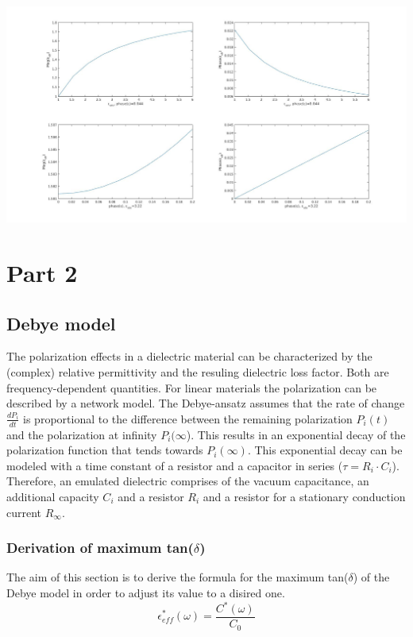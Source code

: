 \begin{center}
	\includegraphics[width=\textwidth]{figures/Theory/layeredepsilon.jpg}
	
	\end{center}
	
	
	
\section{Part 2}


\subsection{Debye model}
The polarization effects in a dielectric material can be characterized by the (complex) relative permittivity and the resuling dielectric loss factor. Both are frequency-dependent quantities. 
For linear materials the polarization can be described by a network model. The Debye-ansatz assumes that the rate of change $ \frac{dP_i}{dt}$ is proportional to the difference between the remaining polarization $P_i(t)$ and the polarization at infinity $P_i(\infty$). This results in an exponential decay of the polarization function that tends towards $P_i(\infty)$. This exponential decay can be modeled with a time constant of a resistor and a capacitor in series ($\tau=R_i \cdot C_i$). Therefore, an emulated dielectric comprises of the vacuum capacitance, an additional capacity $C_i$ and a resistor $R_i$ and a resistor for a stationary conduction current $R_{\infty}$. 

\subsubsection{Derivation of maximum tan($\delta$)}
The aim of this section is to derive the formula for the maximum tan($\delta$) of the Debye model in order to adjust its value to a disired one.
\begin{equation}
\epsilon_{eff}^* (\omega) = \frac{C^*(\omega)}{C_0}
\end{equation}

